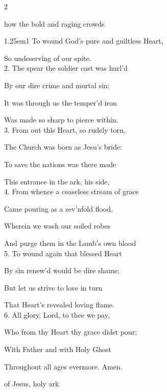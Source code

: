 \clearpage
\mattins
{}

\begin{paracol}{2}
\sloppy

\mattinsInvitatoryHymn
{} how the bold and raging crowds

\begin{hangparas}{1.25em}{1}
To wound God's pure and guiltless Heart,

So undeserving of our spite.\\

2. The spear the soldier cast was hurl'd

By our dire crime and mortal sin:

It was through us the temper'd iron

Was made so sharp to pierce within.\\

3. From out this Heart, so rudely torn,

The Church was born as Jesu's bride:

To save the nations was there made

This entrance in the ark, his side,\\

4. From whence a ceaseless stream of grace

Came pouring as a sev'nfold flood,

Wherein we wash our soiled robes

And purge them in the Lamb's own blood\\

5. To wound again that blessed Heart

By sin renew'd would be dire shame;

But let us strive to love in turn

That Heart's revealed loving flame.\\

6. All glory, Lord, to thee we pay,

Who from thy Heart thy grace didst pour;

With Father and with Holy Ghost

Throughout all ages evermore. Amen.
\end{hangparas}

\switchcolumn

\mattinsOfficeHymn
{} of Jesus, holy ark


\end{paracol}
